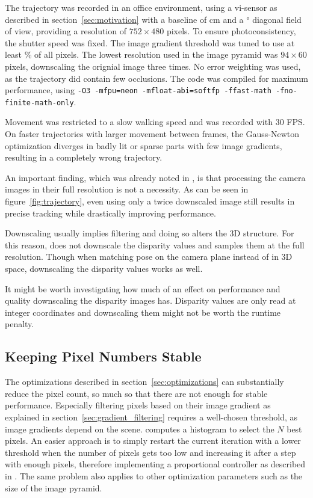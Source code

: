 The trajectory was recorded in an office environment, using a vi-sensor as
described in section~\ref{sec:motivation} with a baseline of \unit[11]{cm} and a
\unit[112]{\degree} diagonal field of view, providing a resolution of $752
\times 480$ pixels. To ensure photoconsistency, the shutter speed was fixed.
The image gradient threshold was tuned to use at least \unit[25]{\%} of all
pixels. The lowest resolution used in the image pyramid was $94 \times 60$
pixels, downscaling the orignial image three times. No error weighting was
used, as the trajectory did contain few occlusions. The code was compiled for
maximum performance, using \texttt{-O3 -mfpu=neon -mfloat-abi=softfp
-ffast-math -fno-finite-math-only}.

Movement was restricted to a slow walking speed and was recorded with 30 FPS.
On faster trajectories with larger movement between frames, the Gauss-Newton
optimization diverges in badly lit or sparse parts with few image gradients,
resulting in a completely wrong trajectory.

An important finding, which was already noted in \cite{comport2007odometry}, is
that processing the camera images in their full resolution is not a necessity.
As can be seen in figure~\ref{fig:trajectory}, even using only a twice
downscaled image still results in precise tracking while drastically improving
performance.

Downscaling usually implies filtering and doing so alters the 3D structure. For
this reason, \cite{comport2007odometry} does not downscale the disparity values and
samples them at the full resolution. Though when matching pose on the camera plane
instead of in 3D space, downscaling the disparity values works as well.

It might be worth investigating how much of an effect on performance and
quality downscaling the disparity images has. Disparity values are only read at
integer coordinates and downscaling them might not be worth the runtime
penalty.

\subsection{Keeping Pixel Numbers Stable}

The optimizations described in section~\ref{sec:optimizations} can
substantially reduce the pixel count, so much so that there are not enough for
stable performance. Especially filtering pixels based on their image gradient
as explained in section~\ref{sec:gradient_filtering} requires a well-chosen
threshold, as image gradients depend on the scene. \cite{comport2007odometry}
computes a histogram to select the $N$ best pixels. An easier approach is to
simply restart the current iteration with a lower threshold when the number of
pixels gets too low and increasing it after a step with enough pixels,
therefore implementing a proportional controller as described in
\cite{omaridenseodometry}. The same problem also applies to other optimization
parameters such as the size of the image pyramid.

